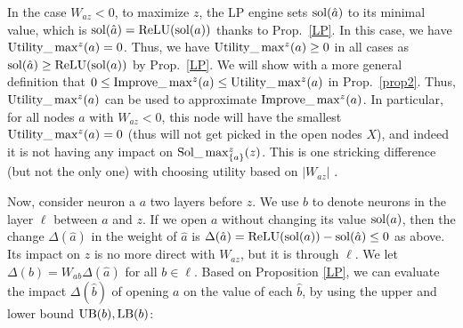 In the case $W_{az}<0$, to maximize $z$, the LP engine sets $\mathrm{sol}(\hat{a})$ to its minimal value, which is $\mathrm{sol}(\hat{a})=\mathrm{ReLU}(\mathrm{sol}(a))$ thanks to Prop.~\ref{LP}. In this case, we have $\mathrm{Utility}\_\max^z(a)=0$.
Thus, we have $\mathrm{Utility}\_\max^z(a) \geq 0$ in all cases
as $\mathrm{sol}(\hat{a}) \geq \mathrm{ReLU}(\mathrm{sol}(a))$ by Prop.~\ref{LP}. 
We will show with a more general definition that $0 \leq \mathrm{Improve}\_\max^z(a) \leq \mathrm{Utility}\_\max^z(a)$ in Prop.~\ref{prop2}. Thus, $\mathrm{Utility}\_\max^z(a)$ can be used to approximate $\mathrm{Improve}\_\max^z(a)$. In particular, for all nodes $a$ with $W_{az}< 0$,
this node will have the smallest $\mathrm{Utility}\_\max\nolimits^z(a)=0$ (thus will not get picked in the open nodes $X$), and indeed it is not having any impact on  $\mathrm{Sol}\_\max_{\{a\}}^z(z)$. This is one stricking difference (but not the only one) with choosing utility based on 
$|W_{az}|$ \cite{DivideAndSlide}.

	
%	
	
% 			

\medskip

Now, consider neuron a $a$ two layers before $z$. We use $b$ to denote neurons in the layer $\ell$ between $a$ and $z$. 
If we open $a$ without changing its value $\mathrm{sol}(a)$, then the change $\Delta(\hat{a})$ in the weight of $\hat{a}$ is 
$\Delta(\hat{a})=\mathrm{ReLU}(\mathrm{sol}(a)) - \mathrm{sol}(\hat{a}) \leq 0$ as above. Its impact on $z$ is no more direct with $W_{az}$, but it is through $\ell$. 
We let $\Delta(b) = W_{ab}\Delta(\hat{a})$ for all $b \in \ell$.
Based on Proposition \ref{LP}, we can evaluate the impact 
$\Delta(\hat{b})$ of opening $a$ on the value of each $\hat{b}$, by using the upper and lower bound $\mathrm{UB}(b),\mathrm{LB}(b)$:

